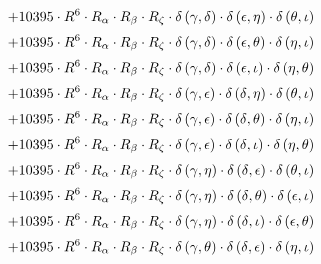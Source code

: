 \begin{subequations}
\begin{gather}
 \\[0.2em] \notag 		 + 10395 \cdot R^{6} \cdot R_{\alpha{}} \cdot R_{\beta{}} \cdot R_{\zeta{}} \cdot \delta{}\left(\gamma{}, \delta{}\right) \cdot \delta{}\left(\epsilon{}, \eta{}\right) \cdot \delta{}\left(\theta{}, \iota{}\right) 
 \\[0.2em] \notag 		 + 10395 \cdot R^{6} \cdot R_{\alpha{}} \cdot R_{\beta{}} \cdot R_{\zeta{}} \cdot \delta{}\left(\gamma{}, \delta{}\right) \cdot \delta{}\left(\epsilon{}, \theta{}\right) \cdot \delta{}\left(\eta{}, \iota{}\right) 
 \\[0.2em] \notag 		 + 10395 \cdot R^{6} \cdot R_{\alpha{}} \cdot R_{\beta{}} \cdot R_{\zeta{}} \cdot \delta{}\left(\gamma{}, \delta{}\right) \cdot \delta{}\left(\epsilon{}, \iota{}\right) \cdot \delta{}\left(\eta{}, \theta{}\right) 
 \\[0.2em] \notag 		 + 10395 \cdot R^{6} \cdot R_{\alpha{}} \cdot R_{\beta{}} \cdot R_{\zeta{}} \cdot \delta{}\left(\gamma{}, \epsilon{}\right) \cdot \delta{}\left(\delta{}, \eta{}\right) \cdot \delta{}\left(\theta{}, \iota{}\right) 
 \\[0.2em] \notag 		 + 10395 \cdot R^{6} \cdot R_{\alpha{}} \cdot R_{\beta{}} \cdot R_{\zeta{}} \cdot \delta{}\left(\gamma{}, \epsilon{}\right) \cdot \delta{}\left(\delta{}, \theta{}\right) \cdot \delta{}\left(\eta{}, \iota{}\right) 
 \\[0.2em] \notag 		 + 10395 \cdot R^{6} \cdot R_{\alpha{}} \cdot R_{\beta{}} \cdot R_{\zeta{}} \cdot \delta{}\left(\gamma{}, \epsilon{}\right) \cdot \delta{}\left(\delta{}, \iota{}\right) \cdot \delta{}\left(\eta{}, \theta{}\right) 
 \\[0.2em] \notag 		 + 10395 \cdot R^{6} \cdot R_{\alpha{}} \cdot R_{\beta{}} \cdot R_{\zeta{}} \cdot \delta{}\left(\gamma{}, \eta{}\right) \cdot \delta{}\left(\delta{}, \epsilon{}\right) \cdot \delta{}\left(\theta{}, \iota{}\right) 
 \\[0.2em] \notag 		 + 10395 \cdot R^{6} \cdot R_{\alpha{}} \cdot R_{\beta{}} \cdot R_{\zeta{}} \cdot \delta{}\left(\gamma{}, \eta{}\right) \cdot \delta{}\left(\delta{}, \theta{}\right) \cdot \delta{}\left(\epsilon{}, \iota{}\right) 
 \\[0.2em] \notag 		 + 10395 \cdot R^{6} \cdot R_{\alpha{}} \cdot R_{\beta{}} \cdot R_{\zeta{}} \cdot \delta{}\left(\gamma{}, \eta{}\right) \cdot \delta{}\left(\delta{}, \iota{}\right) \cdot \delta{}\left(\epsilon{}, \theta{}\right) 
 \\[0.2em] \notag 		 + 10395 \cdot R^{6} \cdot R_{\alpha{}} \cdot R_{\beta{}} \cdot R_{\zeta{}} \cdot \delta{}\left(\gamma{}, \theta{}\right) \cdot \delta{}\left(\delta{}, \epsilon{}\right) \cdot \delta{}\left(\eta{}, \iota{}\right) 

\end{gather}
\end{subequations}
